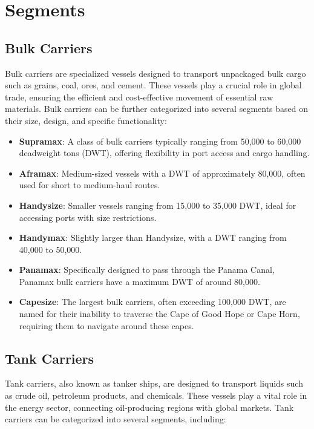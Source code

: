 \section{Segments}

\subsection{Bulk Carriers}

Bulk carriers are specialized vessels designed to transport unpackaged bulk cargo such as grains, coal, ores, and cement. These vessels play a crucial role in global trade, ensuring the efficient and cost-effective movement of essential raw materials. Bulk carriers can be further categorized into several segments based on their size, design, and specific functionality:

\begin{itemize}
    \item \textbf{Supramax}: A class of bulk carriers typically ranging from 50,000 to 60,000 deadweight tons (DWT), offering flexibility in port access and cargo handling.
    \item \textbf{Aframax}: Medium-sized vessels with a DWT of approximately 80,000, often used for short to medium-haul routes.
    \item \textbf{Handysize}: Smaller vessels ranging from 15,000 to 35,000 DWT, ideal for accessing ports with size restrictions.
    \item \textbf{Handymax}: Slightly larger than Handysize, with a DWT ranging from 40,000 to 50,000.
    \item \textbf{Panamax}: Specifically designed to pass through the Panama Canal, Panamax bulk carriers have a maximum DWT of around 80,000.
    \item \textbf{Capesize}: The largest bulk carriers, often exceeding 100,000 DWT, are named for their inability to traverse the Cape of Good Hope or Cape Horn, requiring them to navigate around these capes.
\end{itemize}

\subsection{Tank Carriers}

Tank carriers, also known as tanker ships, are designed to transport liquids such as crude oil, petroleum products, and chemicals. These vessels play a vital role in the energy sector, connecting oil-producing regions with global markets. Tank carriers can be categorized into several segments, including:

